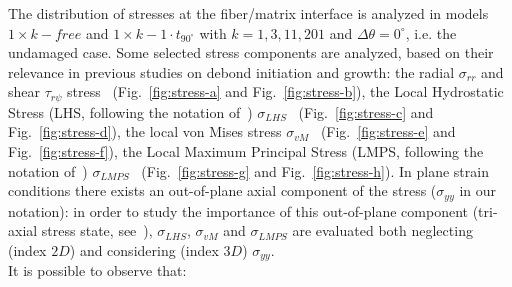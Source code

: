 \documentclass[12pt,a4paper]{article}
\begin{document}
The distribution of stresses at the fiber/matrix interface is analyzed in models $1\times k-free$ and $1\times k-1\cdot t_{90^{\circ}}$ with $k=1,3,11,201$ and $\Delta\theta=0^{\circ}$, i.e. the undamaged case. Some selected stress components are analyzed, based on their relevance in previous studies on debond initiation and growth: the radial $\sigma_{rr}$ and shear $\tau_{r\psi}$ stress~\cite{Mantic2009} (Fig.~\ref{fig:stress-a} and Fig.~\ref{fig:stress-b}), the Local Hydrostatic Stress (LHS, following the notation of~\cite{Carraro2016}) $\sigma_{LHS}$~\cite{Asp1996a,Asp1996b} (Fig.~\ref{fig:stress-c} and Fig.~\ref{fig:stress-d}), the local von Mises stress $\sigma_{vM}$~\cite{Canal2012}  (Fig.~\ref{fig:stress-e} and Fig.~\ref{fig:stress-f}), the Local Maximum Principal Stress (LMPS, following the notation of~\cite{Carraro2016}) $\sigma_{LMPS}$~\cite{Carraro2014}  (Fig.~\ref{fig:stress-g} and Fig.~\ref{fig:stress-h}). In plane strain conditions there exists an out-of-plane axial component of the stress ($\sigma_{yy}$ in our notation): in order to study the importance of this out-of-plane component (tri-axial stress state, see~\cite{Asp1995}), $\sigma_{LHS}$, $\sigma_{vM}$ and $\sigma_{LMPS}$ are evaluated both neglecting (index $2D$) and considering (index $3D$)  $\sigma_{yy}$.\\
It is possible to observe that:
\vspace{-5pt}
\end{document}
